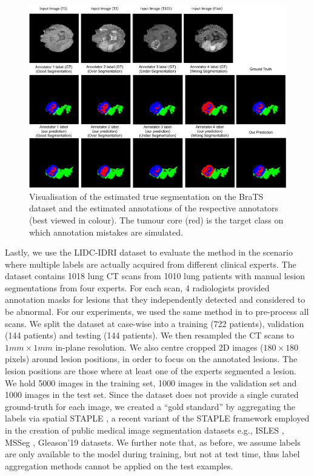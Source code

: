\begin{figure}[t!]
    \centering
    \includegraphics[width=0.95\linewidth]{chapter_8_neurips/picture8.jpg}
        \caption{\footnotesize Visualisation of the estimated true segmentation on the BraTS dataset and the estimated annotations of the respective annotators (best viewed in colour). The tumour core (red) is the target class on which annotation mistakes are simulated.}
        \label{Brats results}
\end{figure}


Lastly, we use the LIDC-IDRI dataset to evaluate the method in the scenario where multiple labels are actually acquired from different clinical experts. The dataset contains 1018 lung CT scans from 1010 lung patients with manual lesion segmentations from four experts. %
For each scan, 4 radiologists provided annotation masks for lesions that they independently detected and considered to be abnormal. For our experiments, we used the same method in \cite{kohl2018probabilistic} to pre-process all scans. We split the dataset at case-wise into a training (722 patients), validation (144 patients) and testing (144 patients). We then resampled the CT scans to $1 mm \times 1 mm$ in-plane resolution. We also centre cropped 2D images ($180 \times 180$ pixels) around lesion positions, in order to focus on the annotated lesions. The lesion positions are those where at least one of the experts segmented a lesion. We hold 5000 images in the training set, 1000 images in the validation set and 1000 images in the test set. Since the dataset does not provide a single curated ground-truth for each image, we created a ``gold standard'' by aggregating the labels via spatial STAPLE \cite{asman2012formulating}, a recent variant of the STAPLE framework employed in the creation of public medical image segmentation datasets e.g., ISLES \cite{winzeck2018isles}, MSSeg \cite{commowick2018objective}, Gleason'19 \cite{gleason2019} datasets. We further note that, as before, we assume labels are only available to the model during training, but not at test time, thus label aggregation methods cannot be applied on the test examples. 


